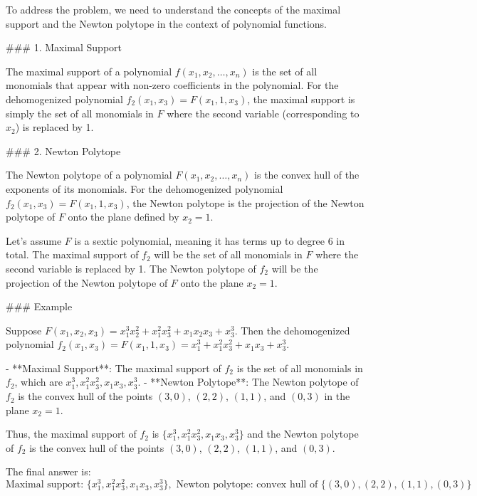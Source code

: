 To address the problem, we need to understand the concepts of the maximal support and the Newton polytope in the context of polynomial functions.

### 1. Maximal Support

The maximal support of a polynomial \( f(x_1, x_2, \ldots, x_n) \) is the set of all monomials that appear with non-zero coefficients in the polynomial. For the dehomogenized polynomial \( f_2(x_1, x_3) = F(x_1, 1, x_3) \), the maximal support is simply the set of all monomials in \( F \) where the second variable (corresponding to \( x_2 \)) is replaced by 1.

### 2. Newton Polytope

The Newton polytope of a polynomial \( F(x_1, x_2, \ldots, x_n) \) is the convex hull of the exponents of its monomials. For the dehomogenized polynomial \( f_2(x_1, x_3) = F(x_1, 1, x_3) \), the Newton polytope is the projection of the Newton polytope of \( F \) onto the plane defined by \( x_2 = 1 \).

Let's assume \( F \) is a sextic polynomial, meaning it has terms up to degree 6 in total. The maximal support of \( f_2 \) will be the set of all monomials in \( F \) where the second variable is replaced by 1. The Newton polytope of \( f_2 \) will be the projection of the Newton polytope of \( F \) onto the plane \( x_2 = 1 \).

### Example

Suppose \( F(x_1, x_2, x_3) = x_1^3 x_2^2 + x_1^2 x_3^2 + x_1 x_2 x_3 + x_3^3 \). Then the dehomogenized polynomial \( f_2(x_1, x_3) = F(x_1, 1, x_3) = x_1^3 + x_1^2 x_3^2 + x_1 x_3 + x_3^3 \).

- **Maximal Support**: The maximal support of \( f_2 \) is the set of all monomials in \( f_2 \), which are \( x_1^3, x_1^2 x_3^2, x_1 x_3, x_3^3 \).
- **Newton Polytope**: The Newton polytope of \( f_2 \) is the convex hull of the points \((3,0)\), \((2,2)\), \((1,1)\), and \((0,3)\) in the plane \( x_2 = 1 \).

Thus, the maximal support of \( f_2 \) is \(\{x_1^3, x_1^2 x_3^2, x_1 x_3, x_3^3\}\) and the Newton polytope of \( f_2 \) is the convex hull of the points \((3,0)\), \((2,2)\), \((1,1)\), and \((0,3)\).

The final answer is:
\[
\boxed{\text{Maximal support: } \{x_1^3, x_1^2 x_3^2, x_1 x_3, x_3^3\}, \text{ Newton polytope: } \text{convex hull of } \{(3,0), (2,2), (1,1), (0,3)\}}
\]